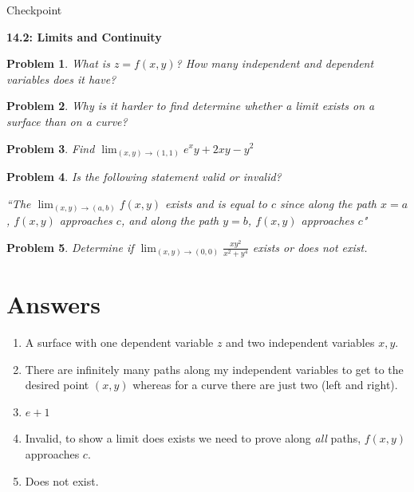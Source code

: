 \documentclass[11pt]{article}
\newtheorem{problem}{Problem}
\newcommand{\vs}{\vspace*{.1in}}
\begin{document}
\begin{huge}
    \begin{center}
        Checkpoint
    \end{center}
\end{huge}
\begin{large}\begin{center}\bf 14.2: Limits and Continuity\end{center}
\end{large}

\vs\vs

\begin{problem}
What is $z=f(x,y)$? How many independent and dependent variables does it have?
\end{problem}

\begin{problem}
Why is it harder to find determine whether a limit exists on a surface than on a curve?
\end{problem}

\begin{problem}
Find $\lim_{(x,y)\to (1,1)} e^xy+2xy-y^2$
\end{problem}


\begin{problem}
Is the following statement valid or invalid?

``The $\lim_{(x,y)\to (a,b)}f(x,y)$ exists and is equal to $c$ since along the path $x = a$, $f(x,y)$ approaches $c$, and along the path $y=b$, $f(x,y)$ approaches $c$"
\end{problem}

\begin{problem}
Determine if $\lim_{(x,y)\to (0,0)}\frac{xy^2}{x^2+y^4}$ exists or does not exist.
\end{problem}


\newpage

\section{Answers}

\begin{enumerate}
    \item A surface with one dependent variable $z$ and two independent variables $x,y$.
    \item There are infinitely many paths along my independent variables to get to the desired point $(x,y)$ whereas for a curve there are just two (left and right).
    \item $e+1$
    \item Invalid, to show a limit does exists we need to prove along \emph{all} paths, $f(x,y)$ approaches $c$.
    \item Does not exist.
\end{enumerate}
\end{document}
